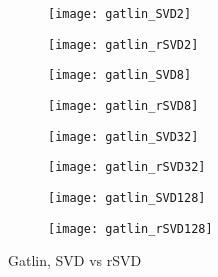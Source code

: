 \documentclass{article}
\begin{document}
\begin{figure}[h!]

\begin{subfigure}{.5\textwidth}
  \centering
  \texttt{[image: gatlin\_SVD2]}
\end{subfigure}%
\begin{subfigure}{.5\textwidth}
  \centering
  \texttt{[image: gatlin\_rSVD2]}
\end{subfigure}

\begin{subfigure}{.5\textwidth}
  \centering
  \texttt{[image: gatlin\_SVD8]}
\end{subfigure}
\begin{subfigure}{.5\textwidth}
  \centering
  \texttt{[image: gatlin\_rSVD8]}
\end{subfigure}

\begin{subfigure}{.5\textwidth}
  \centering
  \texttt{[image: gatlin\_SVD32]}
\end{subfigure}
\begin{subfigure}{.5\textwidth}
  \centering
  \texttt{[image: gatlin\_rSVD32]}
\end{subfigure}

\begin{subfigure}{.5\textwidth}
  \centering
  \texttt{[image: gatlin\_SVD128]}
\end{subfigure}
\begin{subfigure}{.5\textwidth}
  \centering
  \texttt{[image: gatlin\_rSVD128]}
\end{subfigure}


\caption{Gatlin, SVD vs rSVD}
\end{figure}
\end{document}
